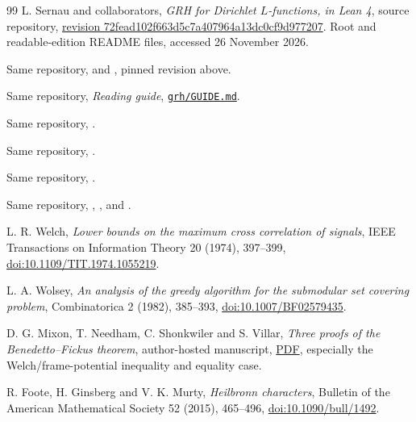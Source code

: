 \begin{thebibliography}{99}
 L. Sernau and collaborators, \emph{GRH for Dirichlet
$L$-functions, in Lean 4}, source repository,
\href{https://github.com/lsernau/grh-lean/tree/72fead102f663d5c7a407964a13dc0cf9d977207}{revision 72fead102f663d5c7a407964a13dc0cf9d977207}.
Root and readable-edition README files, accessed 26 November 2026.

 Same repository,
 and
, pinned revision above.

 Same repository, \emph{Reading guide},
\href{https://github.com/lsernau/grh-lean/blob/72fead102f663d5c7a407964a13dc0cf9d977207/grh/GUIDE.md}{\texttt{grh/GUIDE.md}}.

 Same repository,
.

 Same repository,
.

 Same repository,
.

 Same repository,
,
,
and .

 L. R. Welch, \emph{Lower bounds on the maximum cross
correlation of signals}, IEEE Transactions on Information Theory
20 (1974), 397--399,
\href{https://doi.org/10.1109/TIT.1974.1055219}{doi:10.1109/TIT.1974.1055219}.

 L. A. Wolsey, \emph{An analysis of the greedy algorithm
for the submodular set covering problem}, Combinatorica 2 (1982), 385--393,
\href{https://doi.org/10.1007/BF02579435}{doi:10.1007/BF02579435}.

 D. G. Mixon, T. Needham, C. Shonkwiler and S. Villar,
\emph{Three proofs of the Benedetto--Fickus theorem}, author-hosted manuscript,
\href{https://www.math.colostate.edu/~clayton/research/papers/BenedettoFickus.pdf}{PDF},
especially the Welch/frame-potential inequality and equality case.

 R. Foote, H. Ginsberg and V. K. Murty,
\emph{Heilbronn characters}, Bulletin of the American Mathematical Society
52 (2015), 465--496,
\href{https://doi.org/10.1090/bull/1492}{doi:10.1090/bull/1492}.


\end{thebibliography}
